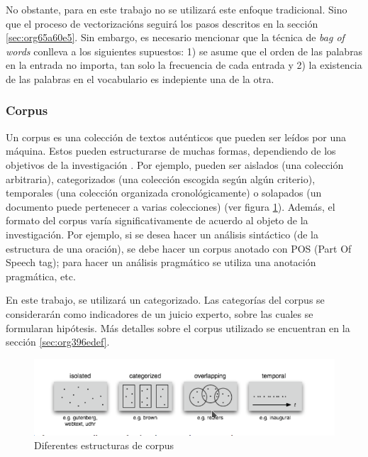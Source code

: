 \documentclass[12pt,letterpaper,twoside]{article}
\begin{document}
No obstante, para en este trabajo no se utilizará este enfoque
tradicional.  Sino que el proceso de vectorizacións seguirá los
pasos descritos en la sección \ref{sec:org65a60e5}. Sin embargo,
es necesario mencionar que la técnica de \emph{bag of words} conlleva
a los siguientes supuestos: 1) se asume que el orden de las
palabras en la entrada no importa, tan solo la frecuencia
de cada entrada y 2) la existencia de las palabras en el
vocabulario es indepiente una de la otra.  

\subsubsection{Corpus}
\label{sec:org71a8ecb}


Un corpus es una colección de textos auténticos que pueden ser
leídos por una máquina. Estos pueden estructurarse de muchas
formas, dependiendo de los objetivos de la investigación
\cite{indurkhya2010handbook}. Por ejemplo, pueden ser aislados (una
colección arbitraria), categorizados (una colección escogida según
algún criterio), temporales (una colección organizada
cronológicamente) o solapados (un documento puede pertenecer a
varias colecciones) \cite{bird2009natural} (ver figura
\ref{fig:org6d58224}). Además, el formato del corpus varía
significativamente de acuerdo al objeto de la investigación. Por
ejemplo, si se desea hacer un análisis sintáctico (de la estructura
de una oración), se debe hacer un corpus anotado con POS (Part Of
Speech tag); para hacer un análisis pragmático se utiliza una
anotación pragmática, etc.

En este trabajo, se utilizará un categorizado. Las categorías del
corpus se considerarán como indicadores de un juicio experto, sobre
las cuales se formularan hipótesis. Más detalles sobre el corpus utilizado
se encuentran en la sección \ref{sec:org396edef}.

\begin{figure}[htbp]
\centering
\includegraphics[width=.9\linewidth]{./assets/estructuras_de_corpus.png}
\caption{\label{fig:org6d58224}Diferentes estructuras de corpus}
\end{figure}
\end{document}
